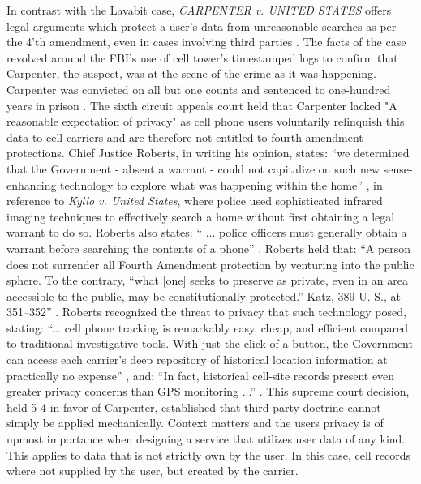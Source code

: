 \documentclass{article}
\begin{document}
  In contrast with the Lavabit case, \emph{CARPENTER v. UNITED STATES} offers
  legal arguments which protect a user's data from unreasonable searches as per
  the 4'th amendment, even in cases involving third parties \cite{Carpenter}.
  The facts of the case revolved around the FBI's use of cell tower's
  timestamped logs to confirm that Carpenter, the suspect, was at the scene of
  the crime as it was happening.  Carpenter was convicted on all but one counts
  and sentenced to one-hundred years in prison \cite{Carpenter}.  The sixth
  circuit appeals court held that Carpenter lacked "A reasonable expectation of
  privacy" as cell phone users voluntarily relinquish this data to cell
  carriers and are therefore not entitled to fourth amendment protections.
  Chief Justice Roberts, in writing his opinion, states: ``we determined that 
  the Government - absent a warrant - could not capitalize on such new 
  sense-enhancing technology to explore what was happening within the home''
  \cite{Carpenter}, in reference to \emph{Kyllo v. United States}, where police
  used sophisticated infrared imaging techniques to effectively search a home
  without first obtaining a legal warrant to do so.  Roberts also states: ``
  ... police officers must generally obtain a warrant before searching the 
  contents of a phone'' \cite{Carpenter}.  Roberts held that: ``A person does 
  not surrender all Fourth Amendment protection by venturing into the public 
  sphere. To the contrary, ``what [one] seeks to preserve as private, even in 
  an area accessible to the public, may be constitutionally protected.'' Katz, 
  389 U. S., at 351–352'' \cite{Carpenter}.  Roberts recognized the threat to
  privacy that such technology posed, stating: ``... cell phone tracking is 
  remarkably easy, cheap, and efficient compared to traditional investigative 
  tools. With just the click of a button, the Government can access each 
  carrier's deep repository of historical location information at practically 
  no expense'' \cite{Carpenter}, and: ``In fact, historical cell-site records 
  present even greater privacy concerns than GPS monitoring ...'' 
  \cite{Carpenter}.  This supreme court decision, held 5-4 in favor of
  Carpenter, established that third party doctrine cannot simply be applied
  mechanically.  Context matters and the users privacy is of upmost importance
  when designing a service that utilizes user data of any kind.  This applies
  to data that is not strictly own by the user.  In this case, cell records
  where not supplied by the user, but created by the carrier.
\end{document}
